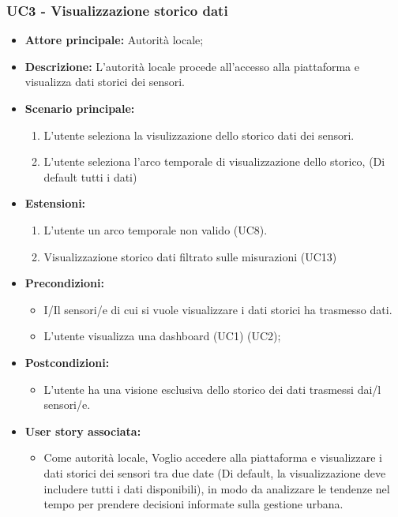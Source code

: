 \subsubsection{UC3 - Visualizzazione storico dati }

\begin{itemize}
    \item \textbf{Attore principale:} Autorità locale;
    \item \textbf{Descrizione:} L'autorità locale procede all'accesso alla piattaforma e visualizza dati storici dei sensori.
    \item \textbf{Scenario principale:}
          \begin{enumerate}
              \item L'utente seleziona la visulizzazione dello storico dati dei sensori.
              \item L'utente seleziona l'arco temporale di visualizzazione dello storico, (Di default tutti i dati)
          \end{enumerate}
    \item \textbf{Estensioni:}
          \begin{enumerate}
              \item L'utente un arco temporale non valido (UC8).
              \item Visualizzazione storico dati filtrato sulle misurazioni (UC13)
          \end{enumerate}
    \item \textbf{Precondizioni:}
          \begin{itemize}
              \item  I/Il sensori/e di cui si vuole visualizzare i dati storici ha trasmesso dati.
              \item  L'utente visualizza una dashboard (UC1) (UC2);
          \end{itemize}
    \item \textbf{Postcondizioni:}
          \begin{itemize}
              \item  L'utente ha una visione esclusiva dello storico dei dati trasmessi  dai/l sensori/e.
          \end{itemize}
    \item \textbf{User story associata:}
          \begin{itemize}
              \item Come autorità locale,
                    Voglio accedere alla piattaforma e visualizzare i dati storici dei sensori tra due date (Di default, la
                    visualizzazione deve includere
                    tutti i dati disponibili),
                    in modo da analizzare le tendenze nel tempo per prendere decisioni informate sulla gestione urbana.
          \end{itemize}
\end{itemize}